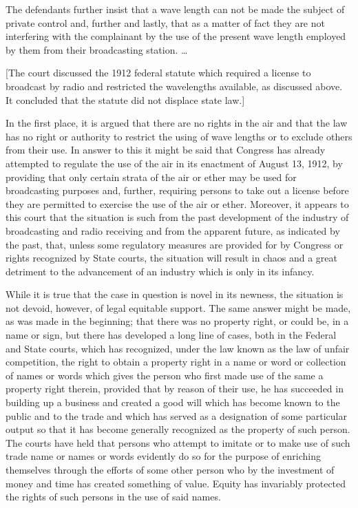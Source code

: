 The defendants further insist that a wave length can not be made the
subject of private control and, further and lastly, that as a matter of fact
they are not interfering with the complainant by the use of the present wave
length employed by them from their broadcasting station. \ldots

[The court discussed the 1912 federal statute which required a license to
broadcast by radio and restricted the wavelengths available, as discussed
above. It concluded that the statute did not displace state law.]

In the first place, it is argued that there are no rights in the air and that
the law has no right or authority to restrict the using of wave lengths or to
exclude others from their use. In answer to this it might be said that Congress
has already attempted to regulate the use of the air in its enactment of August
13, 1912, by providing that only certain strata of the air or ether may be used
for broadcasting purposes and, further, requiring persons to take out a
license before they are permitted to exercise the use of the air or ether.
Moreover, it appears to this court that the situation is such from the past
development of the industry of broadcasting and radio receiving and from the
apparent future, as indicated by the past, that, unless some regulatory
measures are provided for by Congress or rights recognized by State courts, the
situation will result in chaos and a great detriment to the advancement of an
industry which is only in its infancy.

While it is true that the case in question is novel in its newness, the
situation is not devoid, however, of legal equitable support. The same answer
might be made, as was made in the beginning; that there was no property right,
or could be, in a name or sign, but there has developed a long line of cases,
both in the Federal and State courts, which has recognized, under the law known
as the law of unfair competition, the right to obtain a property right in a
name or word or collection of names or words
which gives the person who first made use of the same a property right therein,
provided that by reason of their use, he has succeeded in building up a
business and created a good will which has become known to the public and to
the trade and which has served as a designation of some particular output so
that it has become generally recognized as the property of such person. The
courts have held that persons who attempt to imitate or to make use of such
trade name or names or words evidently do so for the purpose of enriching
themselves through the efforts of some other person who by the investment of
money and time has created something of value. Equity has invariably protected
the rights of such persons in the use of said names.

